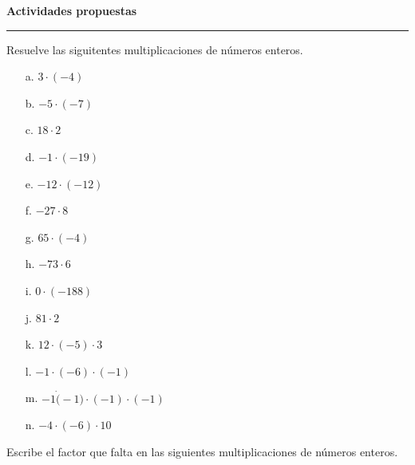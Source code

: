 \documentclass[spanish,letterpaper, 11pt, addpoints, answers]{exam}
\begin{document}
\begin{questions}
\begin{itemize}
  \end{itemize}
  
  \parbox{6in}{
  \textbf{Actividades propuestas}}
  \vspace{0.15in}
  \hrule 

  \question Resuelve las siguitentes multiplicaciones de números enteros.

  \begin{multicols}{2}
    
 
  \begin{itemize}
    \item[a.] $3\cdot (-4)$
    \vspace{1cm}
    \item[b.] $-5\cdot (-7)$
    \vspace{1cm}
    \item[c.] $18\cdot 2$
    \vspace{1cm}
    \item[d.] $-1\cdot (-19)$
    \vspace{1cm}
    \item[e.] $-12\cdot (-12)$
    \vspace{1cm}
    \item[f.] $-27\cdot 8$
    \vspace{1cm}
    \item[g.] $65\cdot (-4)$
    \vspace{1cm}
    \item[h.] $-73\cdot 6$
    \vspace{1cm}
    \item[i.] $0\cdot (-188)$
    \vspace{1cm}
    \item[j.] $81\cdot 2$
    \vspace{1cm}
    \item[k.] $12\cdot (-5)\cdot 3$
    \vspace{1cm}
    \item[l.] $-1\cdot (-6)\cdot (-1)$
    \vspace{1cm}
    \item[m.] $-1\dot (-1)\cdot (-1)\cdot (-1)$
    \vspace{1cm}
    \item[n.] $-4\cdot (-6)\cdot 10$      
  \end{itemize}
 \end{multicols}

  \question Escribe el factor que falta en las siguientes multiplicaciones de números enteros.

  \begin{multicols}{2}
    

\end{multicols}
\end{questions}
\end{document}

